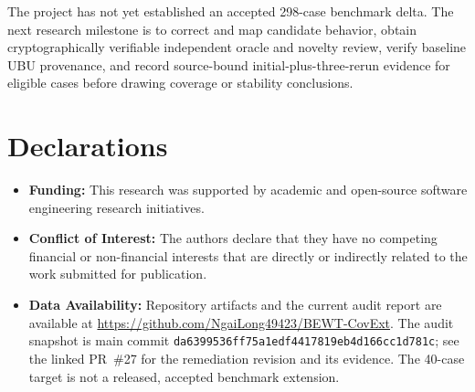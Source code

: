 \documentclass[pdflatex,sn-mathphys-num]{sn-jnl}
\begin{document}
The project has not yet established an accepted 298-case benchmark delta. The next research milestone is to correct and map candidate behavior, obtain cryptographically verifiable independent oracle and novelty review, verify baseline UBU provenance, and record source-bound initial-plus-three-rerun evidence for eligible cases before drawing coverage or stability conclusions.

\section*{Declarations}

\begin{itemize}
    \item \textbf{Funding:} This research was supported by academic and open-source software engineering research initiatives.
    \item \textbf{Conflict of Interest:} The authors declare that they have no competing financial or non-financial interests that are directly or indirectly related to the work submitted for publication.
    \item \textbf{Data Availability:} Repository artifacts and the current audit report are available at \url{https://github.com/NgaiLong49423/BEWT-CovExt}. The audit snapshot is main commit \texttt{da6399536ff75a1edf4417819eb4d166cc1d781c}; see the linked PR~\#27 for the remediation revision and its evidence. The 40-case target is not a released, accepted benchmark extension.
\end{itemize}


\end{document}
